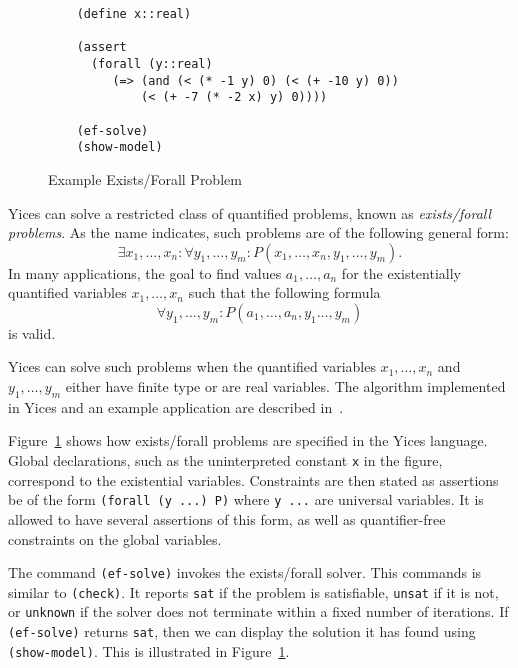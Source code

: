 \documentclass[11pt,twoside,fleqn,openright,titlepage]{cslreport}
\begin{document}
\begin{figure}
\begin{footnotesize}
\begin{verbatim}
    (define x::real)

    (assert
      (forall (y::real)
         (=> (and (< (* -1 y) 0) (< (+ -10 y) 0))
             (< (+ -7 (* -2 x) y) 0))))

    (ef-solve)
    (show-model)
\end{verbatim}
\end{footnotesize}
\caption{Example Exists/Forall Problem}
\label{example:ef}
\end{figure}

Yices can solve a restricted class of quantified problems, known as
\emph{exists/forall problems\/}. As the name indicates, such
problems are of the following general form:
$$\exists x_1,\ldots,x_n:\forall
y_1,\ldots,y_m: P(x_1,\ldots,x_n,y_1,\ldots,y_m).$$ In many
applications, the goal to find values $a_1,\ldots,a_n$ for the
existentially quantified variables $x_1,\ldots,x_n$ such that the
following formula $$\forall
y_1,\ldots,y_m: P(a_1,\ldots,a_n,y_1\ldots,y_m)$$ is valid.

\medskip\noindent
Yices can solve such problems when the quantified variables
$x_1,\ldots,x_n$ and $y_1,\ldots,y_m$ either have finite type or are
real variables. The algorithm implemented in Yices and an example
application are described in~\cite{Gascon+etal:fmcad2014}.

\medskip\noindent Figure~\ref{example:ef} shows how exists/forall
problems are specified in the Yices language. Global declarations,
such as the uninterpreted constant \texttt{x} in the figure,
correspond to the existential variables.  Constraints are then stated
as assertions be of the form \texttt{(forall (y ...) P)} where
\texttt{y ...} are universal variables. It is allowed to have several
assertions of this form, as well as quantifier-free constraints on the
global variables.

\medskip\noindent
The command \texttt{(ef-solve)} invokes the exists/forall solver. This
commands is similar to \texttt{(check)}. It reports \texttt{sat} if
the problem is satisfiable, \texttt{unsat} if it is not, or
\texttt{unknown} if the solver does not terminate within a fixed
number of iterations. If \texttt{(ef-solve)} returns \texttt{sat},
then we can display the solution it has found using \texttt{(show-model)}.
This is illustrated in Figure~\ref{example:ef}.
\end{document}
